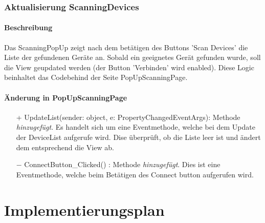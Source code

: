 \documentclass[a4paper,12pt]{article}
\begin{document}
\subsubsection{Aktualisierung ScanningDevices}
\paragraph{Beschreibung}
Das ScanningPopUp zeigt nach dem betätigen des Buttons 'Scan Devices' die Liste der gefundenen Geräte an. Sobald ein geeignetes Gerät gefunden wurde, soll die View geupdated werden (der Button 'Verbinden' wird enabled). Diese Logic beinhaltet das Codebehind der Seite PopUpScanningPage.

\paragraph{Änderung in PopUpScanningPage}
\begin{itemize}
	\item[+] UpdateList(sender: object, e: PropertyChangedEventArgs): Methode \textit{hinzugefügt}. Es handelt sich um eine Eventmethode, welche bei dem Update der DeviceList aufgerufe wird. Dise überprüft, ob die Liste leer ist und ändert dem entsprechend die View ab.
	\item[$-$] ConnectButton\_Clicked() : Methode \textit{hinzugefügt}. Dies ist eine Eventmethode, welche beim Betätigen des Connect button aufgerufen wird.
\end{itemize} 

\section{Implementierungsplan}
\end{document}
